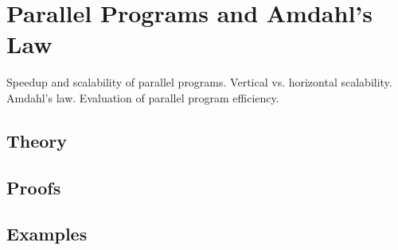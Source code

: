 
\section{Parallel Programs and Amdahl's Law}
\label{sec:1.3.10-parallel-amdahl}

\begin{ticket}
Speedup and scalability of parallel programs. Vertical vs. horizontal scalability. Amdahl's law. Evaluation of parallel program efficiency.
\end{ticket}

\subsection*{Theory}

\subsection*{Proofs}

\subsection*{Examples}
